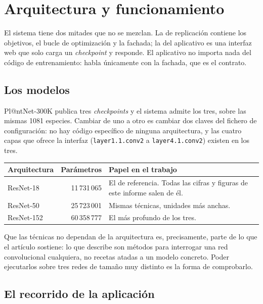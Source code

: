 \documentclass[11pt,a4paper]{article}
\begin{document}
\section{Arquitectura y funcionamiento}

El sistema tiene dos mitades que no se mezclan. La de replicación contiene
los objetivos, el bucle de optimización y la fachada; la del aplicativo es
una interfaz web que solo carga un \emph{checkpoint} y responde. El
aplicativo no importa nada del código de entrenamiento: habla únicamente con
la fachada, que es el contrato.

\subsection{Los modelos}

Pl@ntNet-300K publica tres \emph{checkpoints} y el sistema admite los tres,
sobre las mismas 1081 especies. Cambiar de uno a otro es cambiar dos claves
del fichero de configuración: no hay código específico de ninguna
arquitectura, y las cuatro capas que ofrece la interfaz
(\texttt{layer1.1.conv2} a \texttt{layer4.1.conv2}) existen en los tres.

\begin{center}\small
\begin{tabular}{l r l}
\toprule
\textbf{Arquitectura} & \textbf{Parámetros} & \textbf{Papel en el trabajo} \\
\midrule
ResNet-18 & 11\,731\,065 & El de referencia. Todas las cifras y figuras de
este informe salen de él. \\
ResNet-50 & 25\,723\,001 & Mismas técnicas, unidades más anchas. \\
ResNet-152 & 60\,358\,777 & El más profundo de los tres. \\
\bottomrule
\end{tabular}
\end{center}

Que las técnicas no dependan de la arquitectura es, precisamente, parte de
lo que el artículo sostiene: lo que describe son métodos para interrogar
una red convolucional cualquiera, no recetas atadas a un modelo concreto.
Poder ejecutarlos sobre tres redes de tamaño muy distinto es la forma de
comprobarlo.

\subsection{El recorrido de la aplicación}
\end{document}
